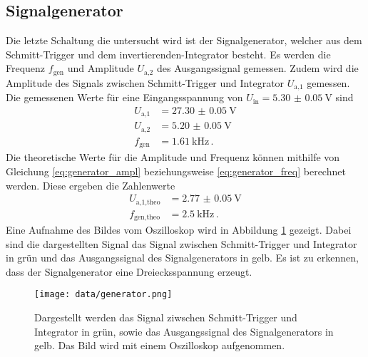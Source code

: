 \subsection{Signalgenerator}
Die letzte Schaltung die untersucht wird ist der Signalgenerator, welcher aus dem Schmitt-Trigger und dem invertierenden-Integrator besteht.
Es werden die Frequenz $f_\text{gen}$ und Amplitude $U_\text{a,2}$ des Ausgangssignal gemessen.
Zudem wird die Amplitude des Signals zwischen Schmitt-Trigger und Integrator $U_\text{a,1}$ gemessen.
Die gemessenen Werte für eine Eingangsspannung von $U_\text{in} = \SI{5.30(5)}{\V}$ sind 
\begin{align*}
    U_\text{a,1} &= \SI{27.30(5)}{\V} \\
    U_\text{a,2} &= \SI{5.20(5)}{\V} \\
    f_\text{gen} &= \SI{1.61}{\kilo\Hz} \, .
\end{align*}
Die theoretische Werte für die Amplitude und Frequenz können mithilfe von Gleichung \eqref{eq:generator_ampl} beziehungsweise \eqref{eq:generator_freq} berechnet werden.
Diese ergeben die Zahlenwerte 
\begin{align*}
    U_\text{a,1,theo} &= \SI{2.77(5)}{\V} \\
    f_\text{gen,theo} &= \SI{2.5}{\kilo\Hz} \, .
\end{align*}
Eine Aufnahme des Bildes vom Oszilloskop wird in Abbildung \ref{fig:gen_oszi} gezeigt.
Dabei sind die dargestellten Signal das Signal zwischen Schmitt-Trigger und Integrator in grün und das Ausgangssignal des Signalgenerators in gelb.
Es ist zu erkennen, dass der Signalgenerator eine Dreiecksspannung erzeugt.
\begin{figure}
    \centering
    \texttt{[image: data/generator.png]}
    \caption{Dargestellt werden das Signal ziwschen Schmitt-Trigger und Integrator in grün, sowie das Ausgangssignal des Signalgenerators in gelb.
    Das Bild wird mit einem Oszilloskop aufgenommen.}
    \label{fig:gen_oszi}
\end{figure}



